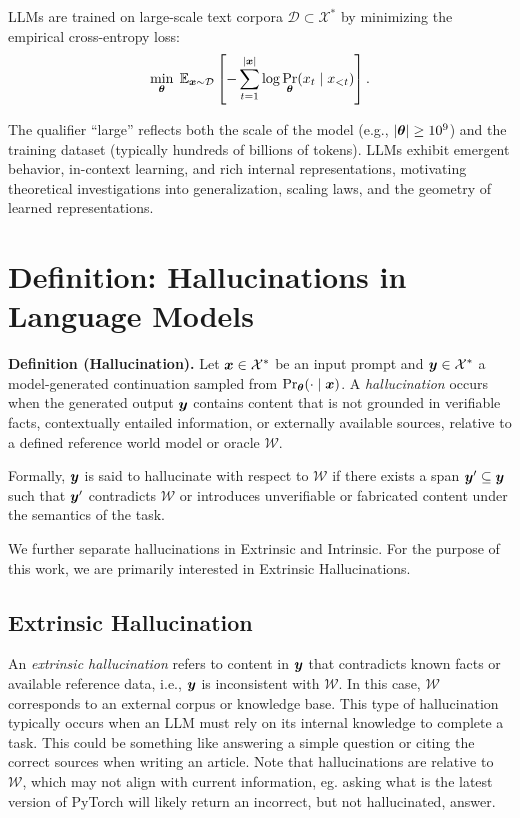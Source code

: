 \documentclass[11pt, oneside]{book}
\newcommand{\cX}{\mathcal{X}}
\newcommand{\cD}{\mathcal{D}}
\theoremstyle{plain}
\theoremstyle{definition}
\theoremstyle{remark}
\begin{document}
LLMs are trained on large-scale text corpora $\cD \subset \cX^*$ by minimizing the empirical cross-entropy loss:
\[
\min_{\vtheta} \; \E_{\vx \sim \cD} \left[ - \sum_{t=1}^{|\vx|} \log \Pr_{\vtheta}(x_t \mid x_{<t}) \right].
\]

The qualifier ``large'' reflects both the scale of the model (e.g., $|{\bm{\theta}}| \geq 10^9$) and the training dataset (typically hundreds of billions of tokens). LLMs exhibit emergent behavior, in-context learning, and rich internal representations, motivating theoretical investigations into generalization, scaling laws, and the geometry of learned representations.


\section*{Definition: Hallucinations in Language Models}

\textbf{Definition (Hallucination).}
Let $\vx \in \cX^*$ be an input prompt and $\vy \in \cX^*$ a model-generated continuation sampled from $\Pr_{{\bm{\theta}}}(\cdot \mid {\bm{x}})$. A \emph{hallucination} occurs when the generated output ${\bm{y}}$ contains content that is not grounded in verifiable facts, contextually entailed information, or externally available sources, relative to a defined reference world model or oracle $\mathcal{W}$.

Formally, ${\bm{y}}$ is said to hallucinate with respect to $\mathcal{W}$ if there exists a span ${\bm{y}}' \subseteq {\bm{y}}$ such that ${\bm{y}}'$ contradicts $\mathcal{W}$ or introduces unverifiable or fabricated content under the semantics of the task.

We further separate hallucinations in Extrinsic and Intrinsic. For the purpose of this work, we are primarily interested in Extrinsic Hallucinations.

\subsection*{Extrinsic Hallucination}

An \emph{extrinsic hallucination} refers to content in ${\bm{y}}$ that contradicts known facts or available reference data, i.e., ${\bm{y}}$ is inconsistent with $\mathcal{W}$. In this case, $\mathcal{W}$ corresponds to an external corpus or knowledge base. This type of hallucination typically occurs when an LLM must rely on its internal knowledge to complete a task. This could be something like answering a simple question or citing the correct sources when writing an article. Note that hallucinations are relative to $\mathcal{W}$, which may not align with current information, eg. asking what is the latest version of PyTorch will likely return an incorrect, but not hallucinated, answer. 
\end{document}
